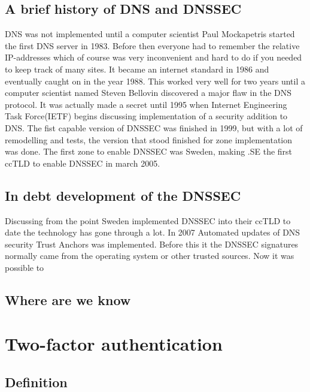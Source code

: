 \documentclass{article}
\begin{document}
		\subsection{A brief history of DNS and DNSSEC}  
		DNS was not implemented until a computer scientist Paul Mockapetris started the first DNS server in 1983. Before then everyone had to remember the relative IP-addresses which of course was very inconvenient and hard to do if you needed to keep track of many sites.
		It became an internet standard in 1986 and eventually caught on in the year 1988.
		This worked very well for two years until a computer scientist named Steven Bellovin discovered a major flaw in the DNS protocol. It was actually made a secret until 1995 when Internet Engineering Task Force(IETF) begins discussing implementation of a security addition to DNS.
		The fist capable version of DNSSEC was finished in 1999, but with a lot of remodelling and tests, the version that stood finished for zone implementation was done.
		The first zone to enable DNSSEC was Sweden, making .SE the first ccTLD to enable DNSSEC in march 2005.\cite{NLnetLabs}
		\subsection{In debt development of the DNSSEC}
		Discussing from the point Sweden implemented DNSSEC into their ccTLD to date the technology has gone through a lot. In 2007 Automated updates of DNS security Trust Anchors was implemented.\cite{trustAnchor} 
		Before this it the DNSSEC signatures normally came from the operating system or other trusted sources. Now it was possible to\cite{icann}
        \subsection{Where are we know}

    
	\clearpage
	\section{Two-factor authentication}
		\subsection{Definition}
        
    \clearpage
	\nocite{*}
	
	
\end{document}
